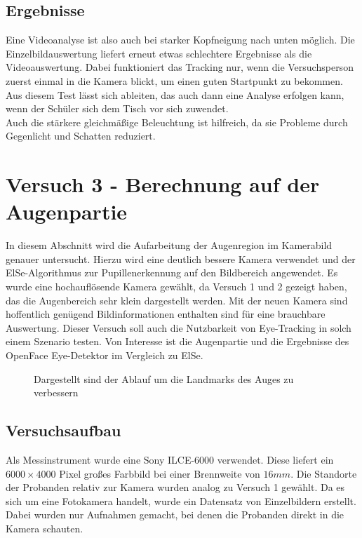 \subsection{Ergebnisse}
Eine Videoanalyse ist also auch bei starker Kopfneigung nach unten möglich. Die Einzelbildauswertung liefert erneut etwas schlechtere Ergebnisse als die Videoauswertung.
Dabei funktioniert das Tracking nur, wenn die Versuchsperson zuerst einmal in die Kamera blickt, um einen guten Startpunkt zu bekommen. Aus diesem Test lässt sich ableiten, das auch dann eine Analyse erfolgen kann, wenn der Schüler sich dem Tisch vor sich zuwendet.\\
Auch die stärkere gleichmäßige Beleuchtung ist hilfreich, da sie Probleme durch Gegenlicht und Schatten reduziert.
\section{Versuch 3 - Berechnung auf der Augenpartie}
In diesem Abschnitt wird die Aufarbeitung der Augenregion im Kamerabild genauer untersucht. Hierzu wird eine deutlich bessere Kamera verwendet und der ElSe-Algorithmus zur Pupillenerkennung auf den Bildbereich angewendet. Es wurde eine hochauflösende Kamera gewählt, da Versuch 1 und 2 gezeigt haben, das die Augenbereich sehr klein dargestellt werden.
Mit der neuen Kamera sind hoffentlich genügend Bildinformationen enthalten sind für eine brauchbare Auswertung. Dieser Versuch soll auch die Nutzbarkeit von Eye-Tracking in solch einem Szenario testen. Von Interesse ist die Augenpartie und die Ergebnisse des OpenFace Eye-Detektor im Vergleich zu ElSe.
\begin{figure}
	\centering
	
	\caption{Dargestellt sind der Ablauf um die Landmarks des Auges zu verbessern}
	\label{graph_Auge_Verbesserung}
\end{figure}
\subsection{Versuchsaufbau}
Als Messinstrument wurde eine Sony ILCE-6000 verwendet. Diese liefert ein $6000\times 4000$ Pixel großes Farbbild bei einer Brennweite von  $16mm$. Die Standorte der Probanden relativ zur Kamera wurden analog zu Versuch 1 gewählt. Da es sich um eine Fotokamera handelt, wurde ein Datensatz von Einzelbildern erstellt. Dabei wurden nur Aufnahmen gemacht, bei denen die Probanden direkt in die Kamera schauten.

